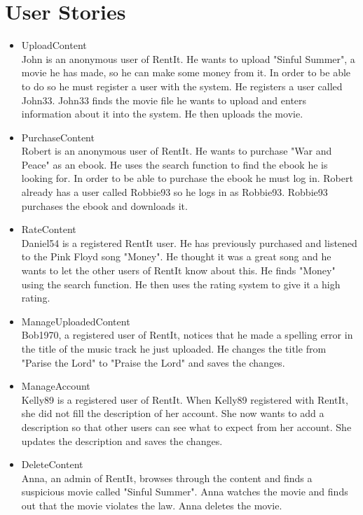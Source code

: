\documentclass[../report.tex]{subfiles}
\begin{document}
\section{User Stories}
\begin{itemize}
\item UploadContent \\
John is an anonymous user of RentIt. He wants to upload "Sinful Summer", a movie he has made, so he can make some money from it. In order to be able to do so he must register a user with the system. He registers a user called John33. John33 finds the movie file he wants to upload and enters information about it into the system. He then uploads the movie.
\item PurchaseContent \\
Robert is an anonymous user of RentIt. He wants to purchase "War and Peace" as an ebook. He uses the search function to find the ebook he is looking for. In order to be able to purchase the ebook he must log in. Robert already has a user called Robbie93 so he logs in as Robbie93. Robbie93 purchases the ebook and downloads it.
\item RateContent \\
Daniel54 is a registered RentIt user. He has previously purchased and listened to the Pink Floyd song "Money". He thought it was a great song and he wants to let the other users of RentIt know about this. He finds "Money" using the search function. He then uses the rating system to give it a high rating.
\item ManageUploadedContent \\
Bob1970, a registered user of RentIt, notices that he made a spelling error in the title of the music track he just uploaded. He changes the title from "Parise the Lord" to "Praise the Lord" and saves the changes.
\item ManageAccount \\
Kelly89 is a registered user of RentIt. When Kelly89 registered with RentIt, she did not fill the description of her account. She now wants to add a description so that other users can see what to expect from her account. She updates the description and saves the changes.
\item DeleteContent \\
Anna, an admin of RentIt, browses through the content and finds a suspicious movie called "Sinful Summer". Anna watches the movie and finds out that the movie violates the law. Anna deletes the movie.
\end{itemize}
\end{document}
